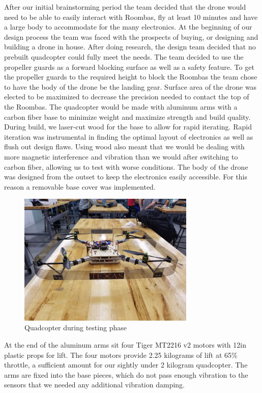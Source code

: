 \documentclass[12pt]{article}
\begin{document}
After our initial brainstorming period the team decided that the drone would need to be able to easily interact with Roombas, fly at least 10 minutes and have a large body to accommodate for the many electronics. At the beginning of our design process the team was faced with the prospects of buying, or designing and building a drone in house. After doing research, the design team decided that no prebuilt quadcopter could fully meet the needs. The team decided to use the propeller guards as a forward blocking surface as well as a safety feature. To get the propeller guards to the required height to block the Roombas the team chose to have the body of the drone be the landing gear. Surface area of the drone was elected to be maximized to decrease the precision needed to contact the top of the Roombas. The quadcopter would be made with aluminum arms with a carbon fiber base to minimize weight and maximize strength and build quality. During build, we laser-cut wood for the base to allow for rapid iterating. Rapid iteration was instrumental in finding the optimal layout of electronics as well as flush out design flaws. Using wood also meant that we would be dealing with more magnetic interference and vibration than we would after switching to carbon fiber, allowing us to test with worse conditions. The body of the drone was designed from the outset to keep the electronics easily accessible. For this reason a removable base cover was implemented. 

\begin{figure}[!htbp]
\begin{center}
\includegraphics[width=0.75\textwidth]{quad}
\caption*{Quadcopter during testing phase}
\end{center}
\end{figure}

At the end of the aluminum arms sit four Tiger MT2216 v2 motors with 12in plastic props for lift. The four motors provide 2.25 kilograms of lift at 65\% throttle, a sufficient amount for our sightly under 2 kilogram quadcopter. The arms are fixed into the base pieces, which do not pass enough vibration to the sensors that we needed any additional vibration damping. 
\end{document}
